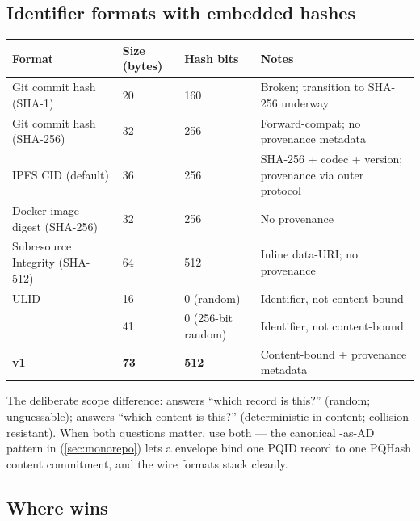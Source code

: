 \subsection{Identifier formats with embedded hashes}

\begin{center}
\small
\begin{tabularx}{\textwidth}{@{}lllX@{}}
\toprule
\textbf{Format} & \textbf{Size (bytes)} & \textbf{Hash bits} & \textbf{Notes} \\
\midrule
Git commit hash (SHA-1)         & 20 & 160 & Broken; transition to SHA-256 underway \\
Git commit hash (SHA-256)       & 32 & 256 & Forward-compat; no provenance metadata \\
IPFS CID (default)              & 36 & 256 & SHA-256 + codec + version; provenance via outer protocol \\
Docker image digest (SHA-256)   & 32 & 256 & No provenance \\
Subresource Integrity (SHA-512) & 64 & 512 & Inline data-URI; no provenance \\
ULID \citep{ulid}               & 16 & 0 (random) & Identifier, not content-bound \\
\pqid{}                          & 41 & 0 (256-bit random) & Identifier, not content-bound \\
\textbf{\pqhash{} v1}           & \textbf{73} & \textbf{512} & Content-bound + provenance metadata \\
\bottomrule
\end{tabularx}
\end{center}

The deliberate scope difference: \pqid{} answers ``which record is this?'' (random; unguessable); \pqhash{} answers ``which content is this?'' (deterministic in content; collision-resistant). When both questions matter, use both --- the canonical \pqid{}-as-AD pattern in \pqcrypt{} (\cref{sec:monorepo}) lets a \pqcrypt{} envelope bind one PQID record to one PQHash content commitment, and the wire formats stack cleanly.

\subsection{Where \pqhash{} wins}

